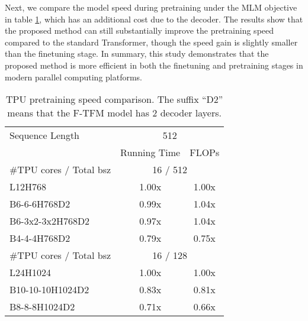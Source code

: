 \documentclass{article}
\theoremstyle{custom}
\begin{document}
Next, we compare the model speed during pretraining under the MLM objective in table \ref{tab:tpu-pre-time}, which has an additional cost due to the decoder.
The results show that the proposed method can still substantially improve the pretraining speed compared to the standard Transformer, though the speed gain is slightly smaller than the finetuning stage.
In summary, this study demonstrates that the proposed method is more efficient in both the finetuning and pretraining stages in modern parallel computing platforms. 
\begin{table}[!ht]
\centering
\begin{tabular}{lcc}
	\toprule
	Sequence Length
	& \multicolumn{2}{c}{512} \\
	\cmidrule(r){1-1} \cmidrule(l){2-3}
	& Running Time & FLOPs \\
	\cmidrule(r){1-1} \cmidrule(l){2-3}
	\#TPU cores / Total bsz 
	& \multicolumn{2}{c}{16 / 512} \\
	\cmidrule(r){1-1} \cmidrule(l){2-3}
	L12H768          & 1.00x & 1.00x \\
	B6-6-6H768D2     & 0.99x & 1.04x \\
	B6-3x2-3x2H768D2 & 0.97x & 1.04x \\
	B4-4-4H768D2     & 0.79x & 0.75x \\
	\midrule
	\#TPU cores / Total bsz
	& \multicolumn{2}{c}{16 / 128} \\
	\cmidrule(r){1-1} \cmidrule(l){2-3}
	L24H1024         & 1.00x & 1.00x \\
	B10-10-10H1024D2 & 0.83x & 0.81x \\
	B8-8-8H1024D2    & 0.71x & 0.66x \\
	\bottomrule
\end{tabular}
\caption{TPU pretraining speed comparison. The suffix ``D2'' means that the F-TFM model has 2 decoder layers.} 
\label{tab:tpu-pre-time}
\end{table} 
\end{document}
